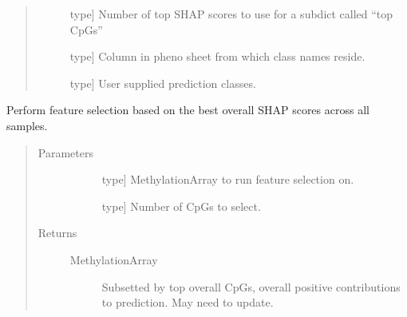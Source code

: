 \documentclass[letterpaper,10pt,english]{sphinxmanual}
\begin{document}
\begin{fulllineitems}
\begin{fulllineitems}
\begin{quote}
\begin{description}
\begin{description}
\item[{}] \leavevmode{[}type{]}
Number of top SHAP scores to use for a subdict called “top CpGs”

\item[{}] \leavevmode{[}type{]}
Column in pheno sheet from which class names reside.

\item[{}] \leavevmode{[}type{]}
User supplied prediction classes.

\end{description}

\end{description}\end{quote}

\end{fulllineitems}


\begin{fulllineitems}
\label{\detokenize{index:methylnet.interpretation_classes.CpGExplainer.feature_select}}
Perform feature selection based on the best overall SHAP scores across all samples.
\begin{quote}\begin{description}
\item[{Parameters}] \leavevmode\begin{description}
\item[{}] \leavevmode{[}type{]}
MethylationArray to run feature selection on.

\item[{}] \leavevmode{[}type{]}
Number of CpGs to select.

\end{description}

\item[{Returns}] \leavevmode\begin{description}
\item[{MethylationArray}] \leavevmode
Subsetted by top overall CpGs, overall positive contributions to prediction. May need to update.

\end{description}


\end{description}
\end{quote}
\end{fulllineitems}
\end{fulllineitems}
\end{document}

